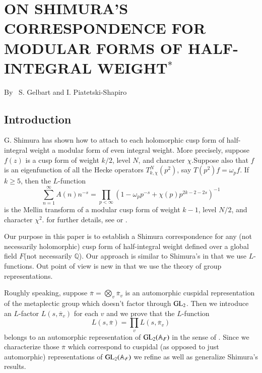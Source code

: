 \chapter{ON SHIMURA'S CORRESPONDENCE FOR MODULAR FORMS OF HALF-INTEGRAL WEIGHT$^{*}$}

\begin{center}
{\large By~ S. Gelbart and I. Piatetski-Shapiro}
\end{center}

\bigskip

\section*{Introduction}\pageoriginale

G. Shimura has shown how to attach to each holomorphic cusp form of half-integral weight a modular form of even integral weight. More precisely, suppose $f(z)$ is a cusp form of weight $k/2$, level $N$, and character $\chi$.\pageoriginale Suppose also that $f$ is an eigenfunction of all the Hecke operators $T^{N}_{k,\chi}(p^{2})$, say $T(p^{2})f=\omega_{p}f$. If $k\geq 5$, then the $L$-function
$$
\sum\limits^{\infty}_{n=1}A(n)n^{-s}=\prod\limits_{p<\infty}\left(1-\omega_{p}p^{-s}+\chi(p)p^{2k-2-2s}\right)^{-1}
$$
is the Mellin transform of a modular cusp form of weight $k-1$, level $N/2$, and character $\chi^{2}$. for further details, see \cite{Shim} or \cite{Niwa}.

Our purpose in this paper is to establish a Shimura correspondence for any (not necessarily holomorphic) cusp form of half-integral weight defined over a global field $F$(not necessarily $\mathbb{Q}$). Our approach is similar to Shimura's in that we use $L$-functions. Out point of view is new in that we use the theory of group representations.

Roughly speaking, suppose $\overline{\pi}=\bigotimes\limits_{v}\overline{\pi}_{v}$ is an automorphic cuspidal representation of the metaplectic group which doesn't factor through $\mathrm{GL}_{2}$. Then we introduce an $L$-factor $L(s,\overline{\pi}_{v})$ for each $v$ and we prove that the $L$-function
$$
L(s,\overline{\pi})=\prod\limits_{v}L(s,\overline{\pi}_{v})
$$
belongs to an automorphic representation of $\mathrm{GL}_{2}(\mathbb{A}_{F})$ in the sense of \cite{Jacquet-Langlands}. Since we characterize those $\overline{\pi}$ which correspond to cuspidal (as opposed to just automorphic) representations of $\mathrm{GL}_{2}(\mathbb{A}_{F})$ we refine as well as generalize Shimura's results.

